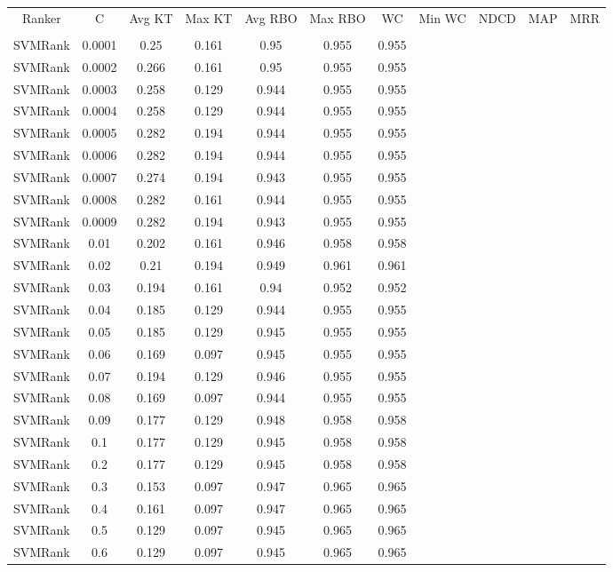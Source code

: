 \begin{longtable}{*{7}{c}}
Ranker & C & Avg KT & Max KT & Avg RBO & Max RBO & WC & Min WC & NDCD & MAP & MRR \\\\ 
SVMRank & 0.0001 & 0.25 & 0.161 & 0.95 & 0.955 & 0.955 \\ 
SVMRank & 0.0002 & 0.266 & 0.161 & 0.95 & 0.955 & 0.955 \\ 
SVMRank & 0.0003 & 0.258 & 0.129 & 0.944 & 0.955 & 0.955 \\ 
SVMRank & 0.0004 & 0.258 & 0.129 & 0.944 & 0.955 & 0.955 \\ 
SVMRank & 0.0005 & 0.282 & 0.194 & 0.944 & 0.955 & 0.955 \\ 
SVMRank & 0.0006 & 0.282 & 0.194 & 0.944 & 0.955 & 0.955 \\ 
SVMRank & 0.0007 & 0.274 & 0.194 & 0.943 & 0.955 & 0.955 \\ 
SVMRank & 0.0008 & 0.282 & 0.161 & 0.944 & 0.955 & 0.955 \\ 
SVMRank & 0.0009 & 0.282 & 0.194 & 0.943 & 0.955 & 0.955 \\ 
SVMRank & 0.01 & 0.202 & 0.161 & 0.946 & 0.958 & 0.958 \\ 
SVMRank & 0.02 & 0.21 & 0.194 & 0.949 & 0.961 & 0.961 \\ 
SVMRank & 0.03 & 0.194 & 0.161 & 0.94 & 0.952 & 0.952 \\ 
SVMRank & 0.04 & 0.185 & 0.129 & 0.944 & 0.955 & 0.955 \\ 
SVMRank & 0.05 & 0.185 & 0.129 & 0.945 & 0.955 & 0.955 \\ 
SVMRank & 0.06 & 0.169 & 0.097 & 0.945 & 0.955 & 0.955 \\ 
SVMRank & 0.07 & 0.194 & 0.129 & 0.946 & 0.955 & 0.955 \\ 
SVMRank & 0.08 & 0.169 & 0.097 & 0.944 & 0.955 & 0.955 \\ 
SVMRank & 0.09 & 0.177 & 0.129 & 0.948 & 0.958 & 0.958 \\ 
SVMRank & 0.1 & 0.177 & 0.129 & 0.945 & 0.958 & 0.958 \\ 
SVMRank & 0.2 & 0.177 & 0.129 & 0.945 & 0.958 & 0.958 \\ 
SVMRank & 0.3 & 0.153 & 0.097 & 0.947 & 0.965 & 0.965 \\ 
SVMRank & 0.4 & 0.161 & 0.097 & 0.947 & 0.965 & 0.965 \\ 
SVMRank & 0.5 & 0.129 & 0.097 & 0.945 & 0.965 & 0.965 \\ 
SVMRank & 0.6 & 0.129 & 0.097 & 0.945 & 0.965 & 0.965 \\ 

\end{longtable}
